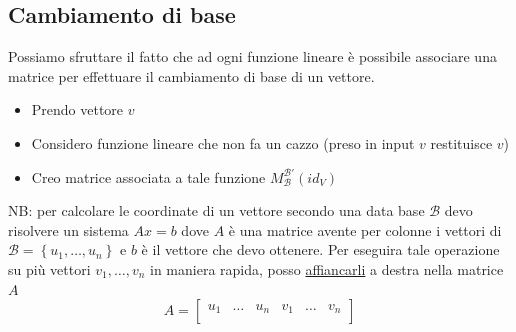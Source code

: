 \documentclass[12pt,a4paper,oneside]{article}
\begin{document}
\subsection{Cambiamento di base}
Possiamo sfruttare il fatto che ad ogni funzione lineare è possibile associare una matrice per effettuare il cambiamento di base di un vettore.
\begin{itemize}
	\item Prendo vettore $ v $
	\item Considero funzione lineare che non fa un cazzo (preso in input $ v $ restituisce $ v $)
	\item Creo matrice associata a tale funzione $ M_\mathcal{B}^{\mathcal{B}'}\left( id_V \right)  $
\end{itemize}
NB: per calcolare le coordinate di un vettore secondo una data base $ \mathcal{B} $ devo risolvere un sistema $ Ax=b $ dove $ A $ è una matrice avente per colonne i vettori di $ \mathcal{B}  = \left\{ u_1,\ldots,u_n \right\} $ e $ b $ è il vettore che devo ottenere.
\vskip3mm
Per eseguira tale operazione su più vettori $ v_1,\ldots,v_n $ in maniera rapida, posso \underline{affiancarli} a destra nella matrice $ A $
\[
	A =
	\begin{bmatrix}
		u_1 & \ldots & u_n & v_1 & \ldots & v_n \\
	\end{bmatrix}
\]
\end{document}
